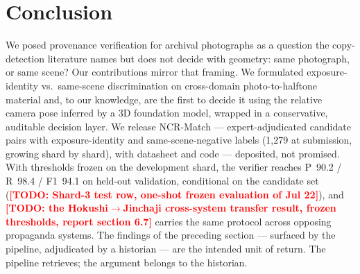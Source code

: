 \documentclass[letterpaper]{article} %
\newcommand{\todo}[1]{\textcolor{red}{\textbf{[TODO: #1]}}}
\begin{document}
\section{Conclusion}
\label{sec:conclusion}

We posed provenance verification for archival photographs as a
question the copy-detection literature names but does not decide with
geometry: same photograph, or same scene? Our contributions mirror
that framing. We formulated exposure-identity vs.\ same-scene
discrimination on cross-domain photo-to-halftone material and, to our
knowledge, are the first to decide it using the relative camera pose
inferred by a 3D foundation model, wrapped in a conservative,
auditable decision layer. We release NCR-Match --- expert-adjudicated
candidate pairs with exposure-identity and same-scene-negative labels
(1{,}279 at submission, growing shard by shard), with datasheet and
code --- deposited, not promised. With
thresholds frozen on the development shard, the verifier reaches
P~90.2 / R~98.4 / F1~94.1 on held-out validation, conditional on the
candidate set (\todo{Shard-3 test row, one-shot frozen evaluation of
Jul 22}), and \todo{the Hokushi$\rightarrow$Jinchaji cross-system
transfer result, frozen thresholds, report section 6.7} carries the same
protocol across opposing propaganda systems. The findings of the
preceding section --- surfaced by the pipeline, adjudicated by a
historian --- are the intended unit of return. The pipeline retrieves;
the argument belongs to the historian.


\end{document}
